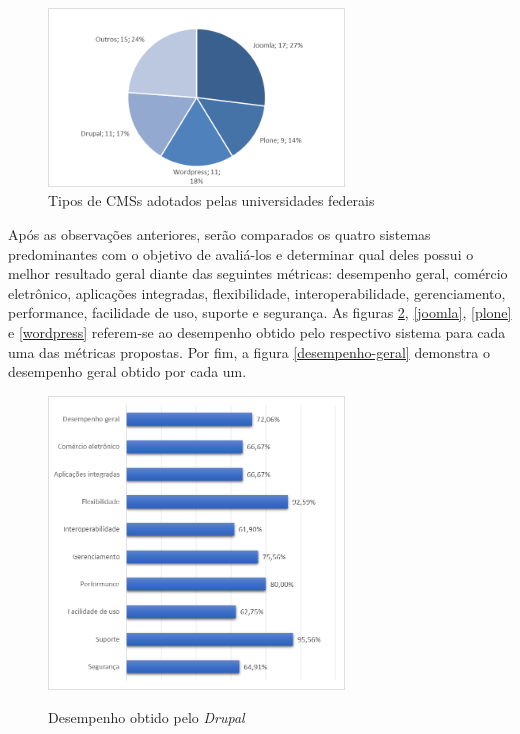 \begin{figure}[htb]
 \centering
 \caption{Tipos de CMSs adotados pelas universidades federais}
 \includegraphics[width=0.7\textwidth]{figuras/tipos-de-cms}
 
 
 \label{figura2}
\end{figure}

\newpage
Após as observações anteriores, serão comparados os quatro sistemas predominantes com o objetivo de avaliá-los e determinar qual deles possui o melhor resultado geral diante das seguintes métricas: desempenho geral, comércio eletrônico, aplicações integradas, flexibilidade, interoperabilidade, gerenciamento, performance, facilidade de uso, suporte e segurança. As figuras \ref{drupal}, \ref{joomla}, \ref{plone} e \ref{wordpress} referem-se ao desempenho obtido pelo respectivo sistema para cada uma das métricas propostas. Por fim, a figura \ref{desempenho-geral} demonstra o desempenho geral obtido por cada um.
\newpage

\begin{figure}[htb]
 \centering
 \caption{Desempenho obtido pelo \textit{Drupal}}
 \includegraphics[width=0.7\textwidth]{figuras/desempenho-drupal}
 \label{drupal}
\end{figure}
\newpage


